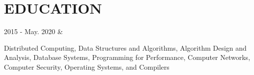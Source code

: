 \documentclass[]{richard-dang}
\begin{document}
\section*{EDUCATION}
\medbreak
\begin{tabularcv}
    2015 - \newline 
    May. 2020    &   
                    \begin{tabitemize}
                        \item Distributed Computing, Data Structures and Algorithms, Algorithm Design and Analysis, Database Systems, Programming for Performance, Computer Networks, Computer Security, Operating Systems, and Compilers 
                    \end{tabitemize} 

\end{tabularcv}
\end{document}
